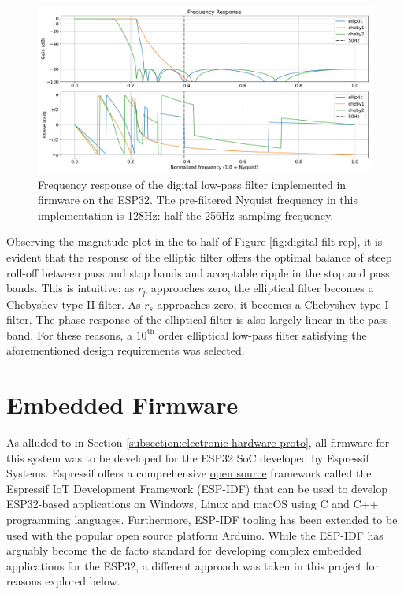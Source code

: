 \begin{figure}[h]
    \centering
    \includegraphics[width=\textwidth]{digital-filt-resp}
    \caption[Frequency response of the digital low-pass filter implemented in firmware on the ESP32]{Frequency response of the digital low-pass filter implemented in firmware on the ESP32. The pre-filtered Nyquist frequency in this implementation is 128Hz: half the 256Hz sampling frequency.}
    \label{fig:digital-filt-resp}
\end{figure}
Observing the magnitude plot in the to half of Figure \ref{fig:digital-filt-rep}, it is evident that the response of the elliptic filter offers the optimal balance of steep roll-off between pass and stop bands and acceptable ripple in the stop and pass bands. This is intuitive: as $r_p$ approaches zero, the elliptical filter becomes a Chebyshev type II filter. As $r_s$ approaches zero, it becomes a Chebyshev type I filter. The phase response of the elliptical filter is also largely linear in the pass-band. For these reasons, a $10^{\textrm{th}}$ order elliptical low-pass filter satisfying the aforementioned design requirements was selected.

\section{Embedded Firmware}
As alluded to in Section \ref{subsection:electronic-hardware-proto}, all firmware for this system was to be developed for the ESP32 SoC developed by Espressif Systems. Espressif offers a comprehensive \href{https://github.com/espressif/esp-idf}{open source} framework called the Espressif IoT Development Framework (ESP-IDF) that can be used to develop ESP32-based applications on Windows, Linux and macOS using C and C++ programming languages. Furthermore, ESP-IDF tooling has been extended to be used with the popular open source platform Arduino. While the ESP-IDF has arguably become the de facto standard for developing complex embedded applications for the ESP32, a different approach was taken in this project for reasons explored below. 

